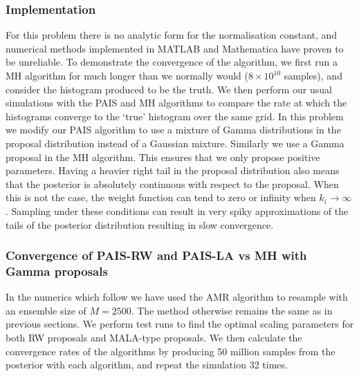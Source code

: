 \documentclass[final]{siamltex}
\begin{document}
\subsubsection{Implementation}\label{sec:chem_implementation}
For this problem there is no analytic form for the normalisation constant, and numerical methods implemented in MATLAB and Mathematica have proven to be unreliable. To demonstrate the convergence of the algorithm, we first run a MH algorithm for much longer than we normally would ($8\times 10^{10}$ samples), and consider the histogram produced to be the truth. We then perform our usual simulations with the PAIS and MH algorithms to compare the rate at which the histograms converge to the `true' histogram over the same grid.
In this problem we modify our PAIS algorithm to use a mixture of Gamma distributions in the proposal distribution instead of a Gaussian mixture. Similarly we use a Gamma proposal in the MH algorithm. This ensures that we only propose positive parameters. Having a heavier right tail in the proposal distribution also means that the posterior is absolutely continuous with respect to the proposal. When this is not the case, the weight function can tend to zero or infinity when $k_i \rightarrow \infty$. Sampling under these conditions can result in very spiky approximations of the tails of the posterior distribution resulting in slow convergence.


\subsubsection{Convergence of PAIS-RW and PAIS-LA vs MH with Gamma proposals}\label{sec:chem_conv}

In the numerics which follow we have used the AMR algorithm to resample with an ensemble size of $M=2500$. The method otherwise remains the same as in previous sections. We perform test runs to find the optimal scaling parameters for both RW proposals and MALA-type proposals. We then calculate the convergence rates of the algorithms by producing 50 million samples from the posterior with each algorithm, and repeat the simulation 32 times.
\end{document}
